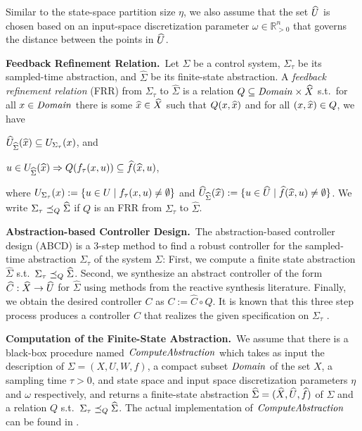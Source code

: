 Similar to the state-space partition size $\eta$, we also assume that the set $\widehat{U}$ is chosen based on an input-space discretization parameter $\omega\in \mathbb{R}^n_{>0}$ that governs the distance between the points in $\widehat{U}$.

\smallskip
\noindent\textbf{Feedback Refinement Relation.}\
Let $\Sigma$ be a control system, $\Sigma_\tau$ be its sampled-time abstraction, and $\widehat{\Sigma}$ be its finite-state abstraction.
A \emph{feedback refinement relation} (FRR) from $\Sigma_\tau$ to $\widehat{\Sigma}$ 
is a relation $Q\subseteq \mathit{Domain}\times \widehat{X}$ s.t.\ 
for all $x\in \mathit{Domain}$ there is some $\widehat{x}\in \widehat{X}$ such that $Q(x,\widehat{x})$ and
for all $(x,\widehat{x})\in Q$, we have
\begin{inparaenum}[(i)]
 \item $\widehat{U}_{\widehat{\Sigma}}(\widehat{x})\subseteq U_{\Sigma_\tau}(x)$, and 
 \item $u\in U_{\widehat{\Sigma}}(\widehat{x}) \Rightarrow Q(f_\tau(x,u))\subseteq \widehat{f}(\widehat{x},u)$,
\end{inparaenum}
where $U_{\Sigma_\tau}(x):=\{ u\in U \mid f_\tau(x,u)\neq \emptyset \}$ and $\widehat{U}_{\widehat{\Sigma}}(\widehat{x}):=\{ u\in \widehat{U} \mid \widehat{f}(\widehat{x},u)\neq \emptyset \}$.
We write $\Sigma_\tau \preceq_{Q} \widehat{\Sigma}$ if $Q$ is an FRR from $\Sigma_\tau$ to $\widehat{\Sigma}$.

\smallskip
\noindent\textbf{Abstraction-based Controller Design.}\
The abstraction-based controller design (ABCD) \cite{reissig2016feedback} is a $3$-step method to find a robust controller for the sampled-time abstraction $\Sigma_\tau$ of the system $\Sigma$:
First, we compute a finite state abstraction $\widehat{\Sigma}$ s.t.\ $\Sigma_\tau \preceq_{Q} \widehat{\Sigma}$.
Second, we synthesize an abstract controller of the form $\widehat{C}:\widehat{X}\rightarrow \widehat{U}$ for $\widehat{\Sigma}$ using methods from the reactive synthesis literature.
Finally, we obtain the desired controller $C$ as $C:=\widehat{C}\circ Q$.
It is known that this three step process produces a controller $C$ that realizes the given specification on $\Sigma_\tau$ \cite{reissig2016feedback}.

\smallskip
\noindent\textbf{Computation of the Finite-State Abstraction.}\
We assume that there is a black-box procedure named $\mathit{ComputeAbstraction}$ which takes as input the description of $\Sigma = (X,U,W,f)$, a compact subset $\mathit{Domain}$ of the set $X$, a sampling time $\tau>0$, and state space and input space discretization parameters $\eta$ and $\omega$ respectively, and returns a finite-state abstraction $\widehat{\Sigma} = (\widehat{X},\widehat{U},\widehat{f})$ of $\Sigma$ and a relation $Q$ s.t.\ $\Sigma_\tau \preceq_{Q} \widehat{\Sigma}$.
The actual implementation of $\mathit{ComputeAbstraction}$ can be found in \cite{reissig2016feedback}.

